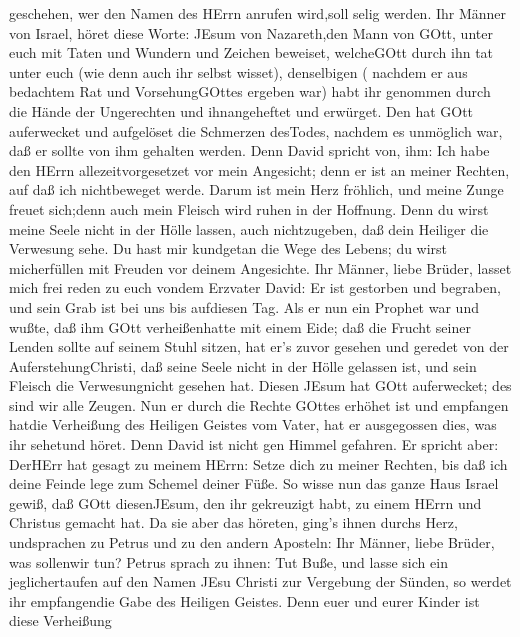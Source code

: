 geschehen, wer den Namen des HErrn anrufen wird,soll selig werden.
 Ihr Männer von Israel, höret diese Worte: JEsum von
Nazareth,den Mann von GOtt, unter euch mit Taten und Wundern und Zeichen
beweiset, welcheGOtt durch ihn tat unter euch (wie denn auch ihr selbst
wisset),  denselbigen ( nachdem er aus bedachtem Rat und
VorsehungGOttes ergeben war) habt ihr genommen durch die Hände der
Ungerechten und ihnangeheftet und erwürget.  Den hat GOtt
auferwecket und aufgelöset die Schmerzen desTodes, nachdem es unmöglich
war, daß er sollte von ihm gehalten werden.  Denn David
spricht von, ihm: Ich habe den HErrn allezeitvorgesetzet vor mein
Angesicht; denn er ist an meiner Rechten, auf daß ich nichtbeweget
werde.  Darum ist mein Herz fröhlich, und meine Zunge
freuet sich;denn auch mein Fleisch wird ruhen in der Hoffnung.
 Denn du wirst meine Seele nicht in der Hölle lassen, auch
nichtzugeben, daß dein Heiliger die Verwesung sehe.  Du
hast mir kundgetan die Wege des Lebens; du wirst micherfüllen mit
Freuden vor deinem Angesichte.  Ihr Männer, liebe Brüder,
lasset mich frei reden zu euch vondem Erzvater David: Er ist gestorben
und begraben, und sein Grab ist bei uns bis aufdiesen Tag. 
Als er nun ein Prophet war und wußte, daß ihm GOtt verheißenhatte mit
einem Eide; daß die Frucht seiner Lenden sollte auf seinem Stuhl sitzen,
 hat er's zuvor gesehen und geredet von der
AuferstehungChristi, daß seine Seele nicht in der Hölle gelassen ist,
und sein Fleisch die Verwesungnicht gesehen hat.  Diesen
JEsum hat GOtt auferwecket; des sind wir alle Zeugen.  Nun
er durch die Rechte GOttes erhöhet ist und empfangen hatdie Verheißung
des Heiligen Geistes vom Vater, hat er ausgegossen dies, was ihr
sehetund höret.  Denn David ist nicht gen Himmel gefahren.
Er spricht aber: DerHErr hat gesagt zu meinem HErrn: Setze dich zu
meiner Rechten,  bis daß ich deine Feinde lege zum Schemel
deiner Füße.  So wisse nun das ganze Haus Israel gewiß, daß
GOtt diesenJEsum, den ihr gekreuzigt habt, zu einem HErrn und Christus
gemacht hat.  Da sie aber das höreten, ging's ihnen durchs
Herz, undsprachen zu Petrus und zu den andern Aposteln: Ihr Männer,
liebe Brüder, was sollenwir tun?  Petrus sprach zu ihnen:
Tut Buße, und lasse sich ein jeglichertaufen auf den Namen JEsu Christi
zur Vergebung der Sünden, so werdet ihr empfangendie Gabe des Heiligen
Geistes.  Denn euer und eurer Kinder ist diese Verheißung
